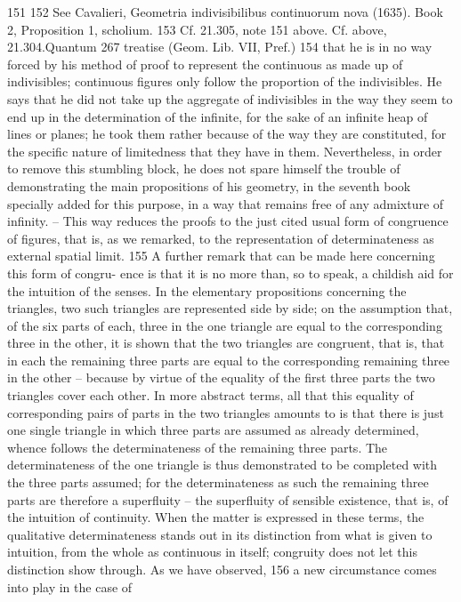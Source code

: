 151
152
See Cavalieri, Geometria indivisibilibus continuorum nova (1635). Book 2, Proposition 1, scholium.
153 Cf. 21.305, note 151 above.
Cf. above, 21.304.Quantum
267
treatise (Geom. Lib. VII, Pref.) 154 that he is in no way forced by his method
of proof to represent the continuous as made up of indivisibles; continuous
figures only follow the proportion of the indivisibles. He says that he did not
take up the aggregate of indivisibles in the way they seem to end up in
the determination of the infinite, for the sake of an infinite heap of lines
or planes; he took them rather because of the way they are constituted, for
the specific nature of limitedness that they have in them. Nevertheless, in
order to remove this stumbling block, he does not spare himself the trouble
of demonstrating the main propositions of his geometry, in the seventh
book specially added for this purpose, in a way that remains free of any
admixture of infinity. – This way reduces the proofs to the just cited usual
form of congruence of figures, that is, as we remarked, to the representation
of determinateness as external spatial limit. 155
A further remark that can be made here concerning this form of congru-
ence is that it is no more than, so to speak, a childish aid for the intuition
of the senses. In the elementary propositions concerning the triangles, two
such triangles are represented side by side; on the assumption that, of the
six parts of each, three in the one triangle are equal to the corresponding
three in the other, it is shown that the two triangles are congruent, that
is, that in each the remaining three parts are equal to the corresponding
remaining three in the other – because by virtue of the equality of the first
three parts the two triangles cover each other. In more abstract terms, all that
this equality of corresponding pairs of parts in the two triangles amounts
to is that there is just one single triangle in which three parts are assumed
as already determined, whence follows the determinateness of the remaining
three parts. The determinateness of the one triangle is thus demonstrated
to be completed with the three parts assumed; for the determinateness as
such the remaining three parts are therefore a superfluity – the superfluity of
sensible existence, that is, of the intuition of continuity. When the matter is
expressed in these terms, the qualitative determinateness stands out in its
distinction from what is given to intuition, from the whole as continuous
in itself; congruity does not let this distinction show through.
As we have observed, 156 a new circumstance comes into play in the case of
